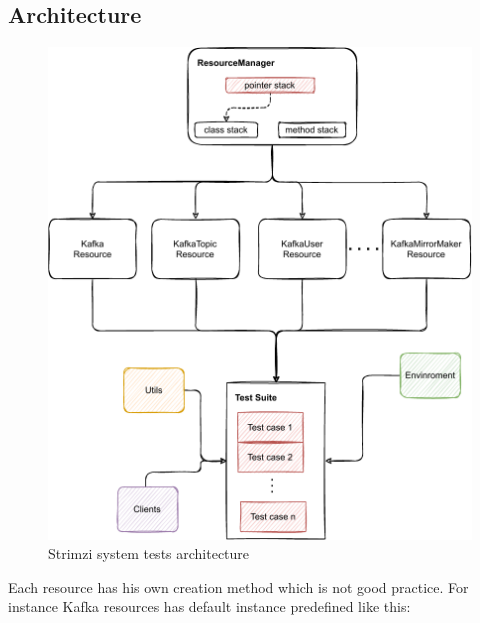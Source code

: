 

\subsection{Architecture}
\label{02d-strimzi-architecture}

\begin{figure}[!ht]
    \centering
    \includegraphics[scale=0.60]{obrazky-figures/02-preliminaries/04-strimzi-system-tests/01-architecture-overall}
    \caption{Strimzi system tests architecture}
    \label{04:fig:strimzi-system-tests-overall}
\end{figure}

Each resource has his own creation method which is not good practice. For instance Kafka resources has default instance predefined like this:

